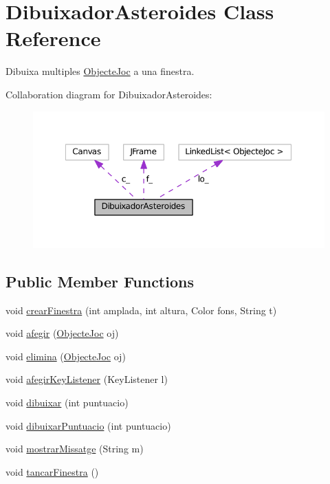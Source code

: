 \hypertarget{class_dibuixador_asteroides}{}\section{Dibuixador\+Asteroides Class Reference}
\label{class_dibuixador_asteroides}


Dibuixa multiples \hyperlink{interface_objecte_joc}{Objecte\+Joc} a una finestra.  




Collaboration diagram for Dibuixador\+Asteroides\+:\nopagebreak
\begin{figure}[H]
\begin{center}
\leavevmode
\includegraphics[width=350pt]{class_dibuixador_asteroides__coll__graph}
\end{center}
\end{figure}
\subsection*{Public Member Functions}
\begin{DoxyCompactItemize}
\item 
void \hyperlink{class_dibuixador_asteroides_a54a43290703d14aee21e5c87a5e6fc5b}{crear\+Finestra} (int amplada, int altura, Color fons, String t)
\item 
void \hyperlink{class_dibuixador_asteroides_ac70561df846258437f4145a41117e9ef}{afegir} (\hyperlink{interface_objecte_joc}{Objecte\+Joc} oj)
\item 
void \hyperlink{class_dibuixador_asteroides_a22269129b517ba0da55bc16e19e24b57}{elimina} (\hyperlink{interface_objecte_joc}{Objecte\+Joc} oj)
\item 
void \hyperlink{class_dibuixador_asteroides_a9add2702a95cbe7e68100c97a63b297f}{afegir\+Key\+Listener} (Key\+Listener l)
\item 
void \hyperlink{class_dibuixador_asteroides_af2138b89d2a5fe31697b2f206cbc2df4}{dibuixar} (int puntuacio)
\item 
void \hyperlink{class_dibuixador_asteroides_a1b25e3ce2739c6422b80dd209c5b713e}{dibuixar\+Puntuacio} (int puntuacio)
\item 
void \hyperlink{class_dibuixador_asteroides_aeff674b652f4c56d95ecd1dd12a1c4e9}{mostrar\+Missatge} (String m)
\item 
void \hyperlink{class_dibuixador_asteroides_a14186d7acd8ca135252848f916416575}{tancar\+Finestra} ()
\end{DoxyCompactItemize}
